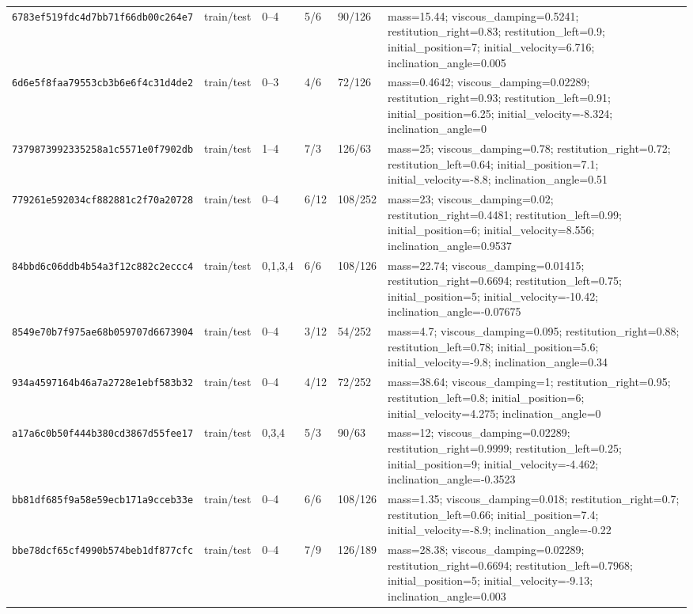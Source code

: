 \begin{tabular*}{\textwidth}{@{\extracolsep{\fill}}llllll@{}}
\texttt{6783ef519fdc4d7bb71f66db00c264e7} & train/test & 0--4 & 5/6 & 90/126 & mass=15.44; viscous\_damping=0.5241; restitution\_right=0.83; restitution\_left=0.9; initial\_position=7; initial\_velocity=6.716; inclination\_angle=0.005 \\
\texttt{6d6e5f8faa79553cb3b6e6f4c31d4de2} & train/test & 0--3 & 4/6 & 72/126 & mass=0.4642; viscous\_damping=0.02289; restitution\_right=0.93; restitution\_left=0.91; initial\_position=6.25; initial\_velocity=-8.324; inclination\_angle=0 \\
\texttt{7379873992335258a1c5571e0f7902db} & train/test & 1--4 & 7/3 & 126/63 & mass=25; viscous\_damping=0.78; restitution\_right=0.72; restitution\_left=0.64; initial\_position=7.1; initial\_velocity=-8.8; inclination\_angle=0.51 \\
\texttt{779261e592034cf882881c2f70a20728} & train/test & 0--4 & 6/12 & 108/252 & mass=23; viscous\_damping=0.02; restitution\_right=0.4481; restitution\_left=0.99; initial\_position=6; initial\_velocity=8.556; inclination\_angle=0.9537 \\
\texttt{84bbd6c06ddb4b54a3f12c882c2eccc4} & train/test & 0,1,3,4 & 6/6 & 108/126 & mass=22.74; viscous\_damping=0.01415; restitution\_right=0.6694; restitution\_left=0.75; initial\_position=5; initial\_velocity=-10.42; inclination\_angle=-0.07675 \\
\texttt{8549e70b7f975ae68b059707d6673904} & train/test & 0--4 & 3/12 & 54/252 & mass=4.7; viscous\_damping=0.095; restitution\_right=0.88; restitution\_left=0.78; initial\_position=5.6; initial\_velocity=-9.8; inclination\_angle=0.34 \\
\texttt{934a4597164b46a7a2728e1ebf583b32} & train/test & 0--4 & 4/12 & 72/252 & mass=38.64; viscous\_damping=1; restitution\_right=0.95; restitution\_left=0.8; initial\_position=6; initial\_velocity=4.275; inclination\_angle=0 \\
\texttt{a17a6c0b50f444b380cd3867d55fee17} & train/test & 0,3,4 & 5/3 & 90/63 & mass=12; viscous\_damping=0.02289; restitution\_right=0.9999; restitution\_left=0.25; initial\_position=9; initial\_velocity=-4.462; inclination\_angle=-0.3523 \\
\texttt{bb81df685f9a58e59ecb171a9cceb33e} & train/test & 0--4 & 6/6 & 108/126 & mass=1.35; viscous\_damping=0.018; restitution\_right=0.7; restitution\_left=0.66; initial\_position=7.4; initial\_velocity=-8.9; inclination\_angle=-0.22 \\
\texttt{bbe78dcf65cf4990b574beb1df877cfc} & train/test & 0--4 & 7/9 & 126/189 & mass=28.38; viscous\_damping=0.02289; restitution\_right=0.6694; restitution\_left=0.7968; initial\_position=5; initial\_velocity=-9.13; inclination\_angle=0.003 \\

\end{tabular*}
